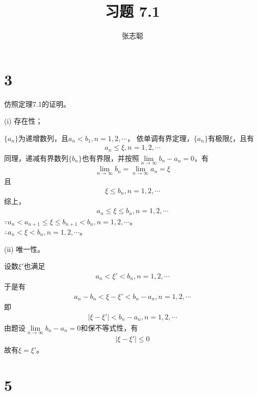 \documentclass{article}
\begin{document}
\title{习题 7.1}
\author{张志聪}
\maketitle

\section*{3}

仿照定理7.1的证明。

(i) 存在性；

$\{a_n\}$为递增数列，且$a_n < b_1, n = 1, 2, \cdots$，
依单调有界定理，$\{a_n\}$有极限$\xi$，且有
\begin{align*}
  a_n \leq \xi, n = 1, 2, \cdots
\end{align*}
同理，递减有界数列$\{b_n\}$也有界限，并按照$\lim\limits_{n \to \infty} b_n - a_n = 0$，有
\begin{align*}
  \lim\limits_{n \to \infty} b_n = \lim\limits_{n \to \infty} a_n = \xi
\end{align*}
且
\begin{align*}
  \xi \leq b_n, n = 1, 2, \cdots
\end{align*}
综上，
\begin{align*}
  a_n \leq \xi \leq b_n, n = 1, 2, \cdots
\end{align*}
$\because a_n < a_{n + 1} \leq \xi \leq b_{n + 1} < b_n, n = 1, 2, \cdots$。 \\
$\therefore a_n < \xi < b_n, n = 1, 2, \cdots$。

(ii) 唯一性。

设数$\xi'$也满足
\begin{align*}
  a_n < \xi' < b_n, n = 1, 2, \cdots
\end{align*}
于是有
\begin{align*}
  a_n - b_n < \xi - \xi' < b_n - a_n, n = 1, 2, \cdots
\end{align*}
即
\begin{align*}
  |\xi - \xi'| < b_n - a_n, n = 1, 2, \cdots
\end{align*}
由题设$\lim\limits_{n \to \infty} b_n - a_n = 0$和保不等式性，有
\begin{align*}
  |\xi - \xi'| \leq 0
\end{align*}
故有$\xi = \xi'$。

\section*{5}
\end{document}
